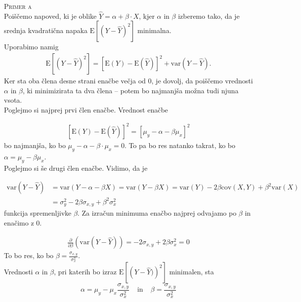 \documentclass[a4paper,12pt]{article}
\begin{document}
\noindent
\textsc{Primer a}
\\
Poiščemo napoved, ki je oblike $\hat{Y} = \alpha + \beta \cdot X$, kjer $\alpha$ in $\beta$ izberemo tako, da je srednja kvadratična napaka $\text{E} \left[ \left( Y - \hat{Y} \right) ^2 \right]$ minimalna.
\\
Uporabimo namig 
\begin{align} 
    \text{E} \left[ \left( Y - \hat{Y} \right) ^2 \right] = \left[ \text{E}(Y) - \text{E}(\hat{Y}) \right]^2 + \text{var}(Y - \hat{Y}).
\end{align}
Ker sta oba člena desne strani enačbe večja od $0$, je dovolj, da poiščemo vrednosti $\alpha$ in $\beta$, ki minimizirata ta dva člena -- potem bo najmanjša možna tudi njuna vsota.
\\
Poglejmo si najprej prvi člen enačbe. Vrednost enačbe

\begin{align*}
    \left[ \text{E}(Y) - \text{E}(\hat{Y}) \right]^2 = \left[ \mu_y - \alpha - \beta \mu_x \right] ^2 
\end{align*}
bo najmanjša, ko bo $ \mu_y - \alpha - \beta \cdot \mu_x = 0$. To pa bo res natanko takrat, ko bo $\alpha = \mu_y - \beta \mu_x$. 
\\
Poglejmo si še drugi člen enačbe. Vidimo, da je 

\begin{align*} 
\text{var}(Y-\hat{Y}) &= \text{var}(Y - \alpha - \beta X) = \text{var}(Y - \beta X) = \text{var}(Y) - 2 \beta \text{cov}(X, Y) + \beta^2 \text{var}(X)
\\
&= \sigma_y^2 - 2 \beta \sigma_{x,y} + \beta^2 \sigma_x^2 
\end{align*}
funkcija spremenljivke $\beta$. Za izračun minimuma enačbo najprej odvajamo po $\beta$ in enačimo z $0$.

\begin{align*}
    \frac{\partial}{\partial \beta} (\text{var}(Y - \hat{Y})) = - 2 \sigma_{x,y} + 2 \beta \sigma_x^2 = 0 
\end{align*}
To bo res, ko bo $ \beta = \frac{\sigma_{x,y}}{\sigma_x^2} $.
\\
Vrednosti $\alpha$ in $\beta$, pri katerih bo izraz $\text{E} \left[ \left( Y - \hat{Y}) \right) ^2 \right]$ minimalen, sta
$$ \alpha = \mu_y - \mu_x \frac{\sigma_{x,y}}{\sigma_x^2} \ \ \ \ \ \text{in} \ \ \ \ \ \beta = \frac{\sigma_{x,y}}{\sigma_x^2} $$
\end{document}
